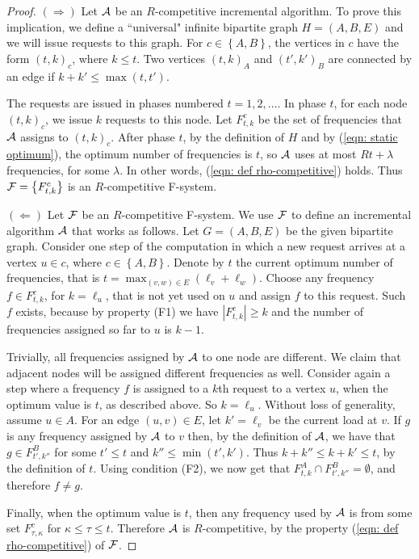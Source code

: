 \documentclass[11pt]{article}
\newcommand{\calA}{{\cal A}}
\newcommand{\calF}{{\cal F}}
\newcommand{\braced}[1]{{ \left\{ #1 \right\} }}
\newcommand{\bigbrace}[1]{{ \big\{ #1 \big\} }}
\begin{document}
\begin{proof}
$(\Rightarrow)$
Let $\calA$ be an $R$-competitive incremental algorithm.
To prove this implication, we define a ``universal" infinite bipartite
graph $H = (A,B,E)$ and we will issue requests to this graph.
For $c \in\braced{A,B}$, the vertices in $c$ have the form $(t,k)_c$,
where $k \le t$. Two vertices $(t,k)_A$ and $(t',k')_B$ are
connected by an edge if $k+k' \le \max(t,t')$. 

The requests are issued in phases numbered $t=1,2,\ldots$. In phase $t$,
for each node $(t,k)_c$, we issue $k$ requests to this node.
Let $F^c_{t,k}$ be the set of frequencies that $\calA$
assigns to $(t,k)_c$. After phase $t$, by the definition of
$H$ and by (\ref{eqn: static optimum}),
the optimum number of frequencies is $t$, so $\calA$
uses at most $Rt+\lambda$ frequencies, for some $\lambda$. 
In other words, (\ref{eqn: def rho-competitive}) holds.
Thus $\calF = \bigbrace{F^c_{t,k}}$ is an $R$-competitive F-system.

$(\Leftarrow)$
Let $\calF$ be an $R$-competitive F-system. We use $\calF$ to define
an incremental algorithm $\calA$ that works as follows. 
Let $G = (A,B,E)$ be the given bipartite graph. Consider one step
of the computation in which a new request arrives at a
vertex $u \in c$, where $c\in\braced{A,B}$. Denote by $t$
the current optimum number of frequencies, that is
$t = \max_{(v,w)\in E}(\ell_v + \ell_w)$. Choose any frequency
$f\in F^c_{t,k}$, for $k = \ell_u$, that is not yet used on $u$
and assign $f$ to this request. Such $f$ exists, because by
property (F1) we have
$|F^c_{t,k}|\ge k$ and the number of frequencies assigned so far 
to $u$ is $k-1$. 

Trivially, all frequencies assigned by $\calA$ to one node are different.
We claim that adjacent nodes will be assigned
different frequencies as well. Consider again a step where a frequency
$f$ is assigned to a $k$th request to a vertex $u$, 
when the optimum value is $t$, as described above. So $k = \ell_u$.
Without loss of generality, assume $u\in A$. For an edge $(u,v)\in E$,
let $k' = \ell_v$ be the current load at $v$. If
$g$ is any frequency assigned by $\calA$ to $v$ then, by
the definition of $\calA$, we have that
$g\in F^B_{t',k''}$ for some $t'\le t$ and $k''\le \min(t', k')$.
Thus $k+k'' \le k+k' \le t$, by the definition of $t$.
Using condition (F2), we now get that
$F^A_{t,k}\cap F^B_{t',k''} = \emptyset$, and therefore $f\neq g$.

Finally, when the optimum value is $t$, then any frequency
used by $\calA$ is from some set $F^c_{\tau,\kappa}$ for
$\kappa\le\tau\le t$. Therefore $\calA$ is $R$-competitive, by the
property (\ref{eqn: def rho-competitive}) of $\calF$.
\end{proof}
\end{document}
